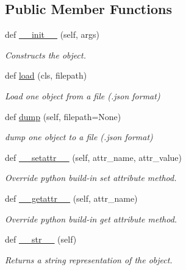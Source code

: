 \subsection*{Public Member Functions}
\begin{DoxyCompactItemize}
\item 
def \hyperlink{classsylva_1_1base_1_1sylva__base_1_1_s_y_l_v_a_base_adb3747bc0503b669cbc05e7419adb454}{\+\_\+\+\_\+init\+\_\+\+\_\+} (self, args)
\begin{DoxyCompactList}\small\item\em Constructs the object. \end{DoxyCompactList}\item 
def \hyperlink{classsylva_1_1base_1_1sylva__base_1_1_s_y_l_v_a_base_af68e05257afb40aa828aa9e2a73b267f}{load} (cls, filepath)
\begin{DoxyCompactList}\small\item\em Load one object from a file (.json format) \end{DoxyCompactList}\item 
def \hyperlink{classsylva_1_1base_1_1sylva__base_1_1_s_y_l_v_a_base_a196978bd73392249f19f817bc1033d8e}{dump} (self, filepath=None)
\begin{DoxyCompactList}\small\item\em dump one object to a file (.json format) \end{DoxyCompactList}\item 
def \hyperlink{classsylva_1_1base_1_1sylva__base_1_1_s_y_l_v_a_base_a073105841fe00ad333bf679a24fa24d9}{\+\_\+\+\_\+setattr\+\_\+\+\_\+} (self, attr\+\_\+name, attr\+\_\+value)
\begin{DoxyCompactList}\small\item\em Override python build-\/in set attribute method. \end{DoxyCompactList}\item 
def \hyperlink{classsylva_1_1base_1_1sylva__base_1_1_s_y_l_v_a_base_af30165f6499a5efacb683c2194f53a73}{\+\_\+\+\_\+getattr\+\_\+\+\_\+} (self, attr\+\_\+name)
\begin{DoxyCompactList}\small\item\em Override python build-\/in get attribute method. \end{DoxyCompactList}\item 
def \hyperlink{classsylva_1_1base_1_1sylva__base_1_1_s_y_l_v_a_base_a6c1ed8e83c61ea8a6035b5e4460989f3}{\+\_\+\+\_\+str\+\_\+\+\_\+} (self)
\begin{DoxyCompactList}\small\item\em Returns a string representation of the object. \end{DoxyCompactList}\item 

\end{DoxyCompactItemize}

